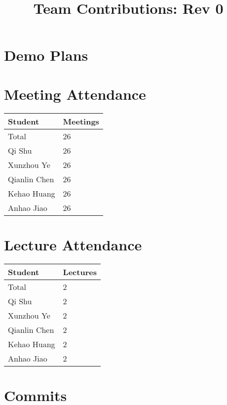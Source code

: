 \documentclass{article}
\title{Team Contributions: Rev 0\\\progname}
\author{\authname}
\date{}
\begin{document}
\maketitle

\section{Demo Plans}


\section{Meeting Attendance}

\begin{table}[H]
\centering
\begin{tabular}{ll}
\toprule
\textbf{Student} & \textbf{Meetings}\\
\midrule
Total &26\\
Qi Shu & 26\\
Xunzhou Ye & 26\\
Qianlin Chen & 26\\
Kehao Huang & 26\\
Anhao Jiao & 26\\
\bottomrule
\end{tabular}
\end{table}



\section{Lecture Attendance}

\begin{table}[H]
\centering
\begin{tabular}{ll}
\toprule
\textbf{Student} & \textbf{Lectures}\\
\midrule
Total &2\\
Qi Shu & 2\\
Xunzhou Ye & 2\\
Qianlin Chen & 2\\
Kehao Huang & 2\\
Anhao Jiao & 2\\
\bottomrule
\end{tabular}
\end{table}


\section{Commits}
\end{document}
